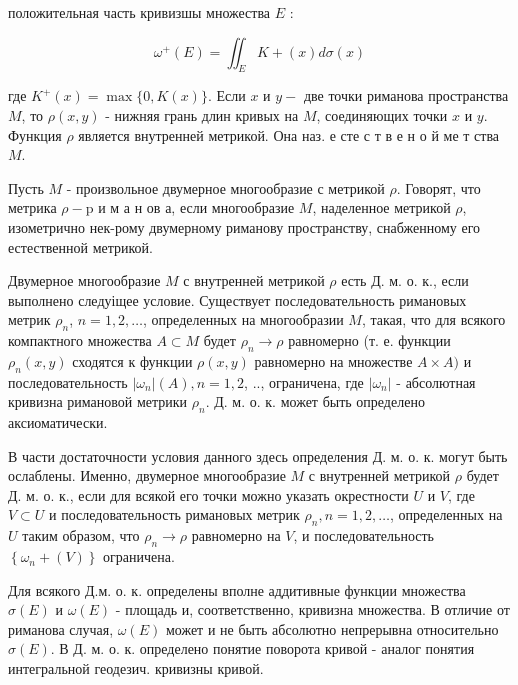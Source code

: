 \documentclass[10pt]{article}
\begin{document}
положительная часть кривизшы множества $E$ :



\[

\omega^{+}(E)=\iint_{E} K+(x) d \sigma(x)

\]



где $K^{+}(x)=\max \{0, K(x)\}$. Если $x$ и $y-$ две точки риманова пространства $M$, то $\rho(x, y)$ - нижняя грань длин кривых на $M$, соединяющих точки $x$ и $y$. Функция $\rho$ является внутренней метрикой. Она наз. е сте с т в е н о й ме т ства $M$.



Пусть $M$ - произвольное двумерное многообразие с метрикой $\rho$. Говорят, что метрика $\rho-\mathrm{p}$ и м а н ов а, если многообразие $M$, наделенное метрикой $\rho$, изометрично нек-рому двумерному риманову пространству, снабженному его естественной метрикой.



Двумерное многообразие $M$ с внутренней метрикой $\rho$ есть Д. м. о. к., если выполнено следуіщее условие. Существует последовательность римановых метрик $\rho_{n}$, $n=1,2, \ldots$, определенных на многообразии $M$, такая, что для всякого компактного множества $A \subset M$ будет $\rho_{n} \rightarrow \rho$ равномерно (т. е. функции $\rho_{n}(x, y)$ сходятся к функции $\rho(x, y)$ равномерно на множестве $A \times A)$ и последовательность $\left|\omega_{n}\right|(A), n=1,2$, .., ограничена, где $\left|\omega_{n}\right|$ - абсолютная кривизна римановой метрики $\rho_{n}$. Д. м. о. к. может быть определено аксиоматически.



В части достаточности условия данного здесь определения Д. м. о. к. могут быть ослаблены. Именно, двумерное многообразие $M$ с внутренней метрикой $\rho$ будет Д. м. о. к., если для всякой его точки можно указать окрестности $U$ и $V$, где $V \subset U$ и последовательность римановых метрик $\rho_{n}, n=1,2, \ldots$, определенных на $U$ таким образом, что $\rho_{n} \rightarrow \rho$ равномерно на $V$, и последовательность $\left\{\omega_{n}+(V)\right\}$ ограничена.



Для всякого Д.м. о. к. определены вполне аддитивные функции множества $\sigma(E)$ и $\omega(E)$ - площадь и, соответственно, кривизна множества. В отличие от риманова случая, $\omega(E)$ может и не быть абсолютно непрерывна относительно $\sigma(E)$. В Д. м. о. к. определено понятие поворота кривой - аналог понятия интегральной геодезич. кривизны кривой.
\end{document}
